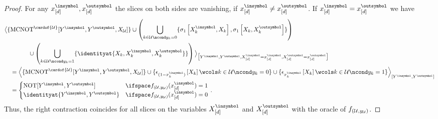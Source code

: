 \begin{proof}
    For any $\ccatindexof{[\catorder]}{\insymbol},\ccatindexof{[\catorder]}{\outsymbol}$ the slices on both sides are vanishing, if $\ccatindexof{[\catorder]}{\insymbol}\neq\ccatindexof{[\catorder]}{\outsymbol}$.
    If $\ccatindexof{[\catorder]}{\insymbol}=\ccatindexof{[\catorder]}{\outsymbol}$ we have
    \begin{align*}
        &\breakablecontractionof{
            \{\mathrm{MCNOT}^{\cardof{\hardlegset}}[\cheadvariable{\insymbol},\cheadvariable{\outsymbol},\catvariableof{\hardlegset}]\}
            \cup \left(\bigcup_{\catenumerator\in\hardlegset\ncond\headindexof{\catenumerator}=0}\{\paulixat{\ccatvariableof{\catenumerator}{\insymbol},\catvariableof{\catenumerator}},
                     \paulixat{\catvariableof{\catenumerator},\ccatvariableof{\catenumerator}{\outsymbol}}\}\right) \\
            &\quad\quad\quad\quad \cup \left(\bigcup_{\catenumerator\in\hardlegset\ncond\headindexof{\catenumerator}=1}\{
                                           \identityat{\catvariableof{\catenumerator},\ccatvariableof{\catenumerator}{\insymbol},\ccatvariableof{\catenumerator}{\outsymbol}}
                                           \}\right)
        }{
            \cheadvariable{\insymbol},\cheadvariable{\outsymbol},\ccatvariableof{[\catorder]}{\insymbol}=\ccatindexof{[\catorder]}{\insymbol},\ccatvariableof{[\catorder]}{\outsymbol}=\ccatindexof{[\catorder]}{\outsymbol}
        } \\
        & \quad = \contractionof{\{\mathrm{MCNOT}^{\cardof{\hardlegset}}[\cheadvariable{\insymbol},\cheadvariable{\outsymbol},\catvariableof{\hardlegset}]\}
            \cup\{\onehotmapofat{(1-\ccatindexof{\catenumerator}{\insymbol})}{\catvariableof{\catenumerator}} \wcols \catenumerator\in\hardlegset\ncond\headindexof{\catenumerator}=0\}
            \cup\{\onehotmapofat{\ccatindexof{\catenumerator}{\insymbol}}{\catvariableof{\catenumerator}} \wcols \catenumerator\in\hardlegset\ncond\headindexof{\catenumerator}=1\}
        }{ \cheadvariable{\insymbol},\cheadvariable{\outsymbol}}\\
        & \quad =
        \begin{cases}
            \mathrm{NOT}[\cheadvariable{\insymbol},\cheadvariable{\outsymbol}] & \ifspace \formulaof{\hardparam}(\ccatindexof{[\catorder]}{\insymbol})=1 \\
            \identityat{\cheadvariable{\insymbol},\cheadvariable{\outsymbol}} & \ifspace \formulaof{\hardparam}(\ccatindexof{[\catorder]}{\insymbol})=0
        \end{cases} \, .
    \end{align*}
    Thus, the right contraction coincides for all slices on the variables $\ccatvariableof{[\catorder]}{\insymbol}$ and $\ccatvariableof{[\catorder]}{\outsymbol}$ with the oracle of $f_{(\mathcal{U},y_{\mathcal{U}})}$.
\end{proof}

